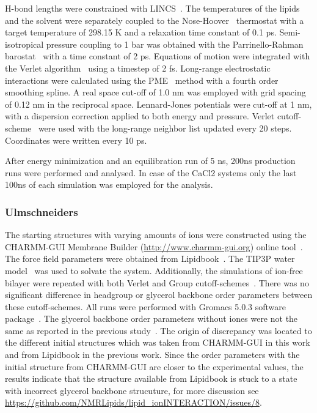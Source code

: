 \documentclass[pre,aps,floatfix,authordate1-4,twocolumn]{revtex4-1}
\begin{document}
H-bond lengths were constrained with LINCS~\cite{hess97,hess07}. The temperatures of the lipids and the solvent were separately coupled to the 
Nose-Hoover~\cite{nose84,hoover85} thermostat with a target temperature of 298.15 K and a relaxation time constant of 0.1 ps. Semi-isotropical pressure 
coupling to 1 bar was obtained with the Parrinello-Rahman barostat~\cite{parrinello81} with a time constant of 2 ps. Equations of motion were integrated 
with the Verlet algorithm~\cite{pall13} using a timestep of 2 fs. Long-range electrostatic interactions were calculated using the PME~\cite{darden93,essman95} method 
with a fourth order smoothing spline. A real space cut-off of 1.0 nm was employed with grid spacing of 0.12 nm in the reciprocal space. 
Lennard-Jones potentials were cut-off at 1 nm, with a dispersion correction applied to both energy and pressure. Verlet cutoff-scheme~\cite{pall13} 
were used with the long-range neighbor list updated every 20 steps. Coordinates were written every 10 ps.

After energy minimization and an equilibration run of 5 ns, 200ns production runs were performed and analysed. In case of the CaCl2 systems 
only the last 100ns of each simulation was employed for the analysis.

\subsubsection{Ulmschneiders}
The starting structures with varying amounts of ions were constructed using the CHARMM-GUI Membrane Builder (\url{http://www.charmm-gui.org}) 
online tool~\cite{lee15}. The force field parameters were obtained from Lipidbook~\cite{domanski10}. The TIP3P water model~\cite{jorgensen83} 
was used to solvate the system.  Additionally, the simulations of ion-free bilayer were repeated with both Verlet and Group cutoff-schemes~\cite{ulmschneiderPOPC0mMNaClfiles}. 
There was no significant difference in headgroup or glycerol backbone order parameters between these cutoff-schemes. All runs were performed with Gromacs 5.0.3 software package~\cite{abraham15}. 
The glycerol backbone order parameters without iones were not the same as reported in the previous study~\cite{botan15}.
The origin of discrepancy was located to the different initial structures which was taken from CHARMM-GUI in this work
and from Lipidbook in the previous work. Since the order parameters with the initial structure from CHARMM-GUI are
closer to the experimental values, the results indicate that the structure available from Lipidbook is stuck to a
state with incorrect glycerol backbone strucuture, for more discussion see \url{https://github.com/NMRLipids/lipid_ionINTERACTION/issues/8}.
\end{document}
